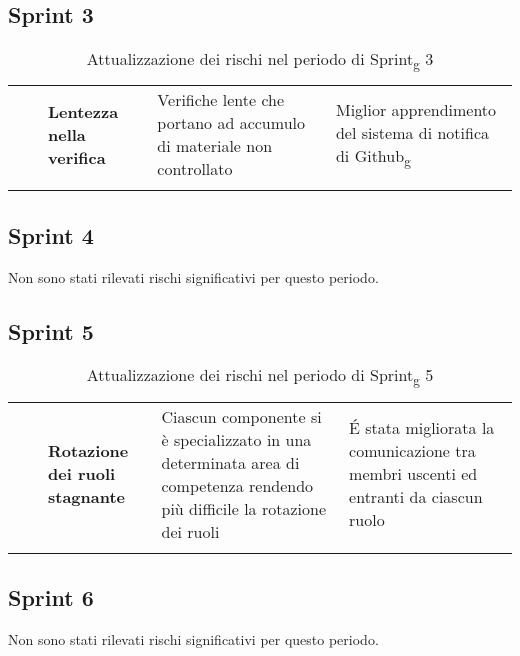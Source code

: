 \subsection{Sprint 3}
\begin{longtable}{ 
	>{\centering}M{0.20\textwidth} 
	>{\raggedright}M{0.30\textwidth}
	>{\raggedright}M{0.40\textwidth}
	}
	\rowcolorhead
	\centering 
	 &	
	 &
	\endfirsthead	
	\endhead
	
	\textbf{Lentezza nella verifica} & Verifiche lente che portano ad accumulo di materiale non controllato & Miglior apprendimento del sistema di notifica di Github\textsubscript{g} \tabularnewline
	\captionline \caption{Attualizzazione dei rischi nel periodo di Sprint\textsubscript{g} 3}
\end{longtable}

\subsection{Sprint 4}
Non sono stati rilevati rischi significativi per questo periodo.

\subsection{Sprint 5}
\begin{longtable}{ 
	>{\centering}M{0.20\textwidth} 
	>{\raggedright}M{0.30\textwidth}
	>{\raggedright}M{0.40\textwidth}
	}
	\rowcolorhead
	\centering 
	 &	
	 &
	\endfirsthead	
	\endhead
	
	\textbf{Rotazione dei ruoli stagnante} & Ciascun componente si è specializzato in una determinata area di competenza rendendo più difficile la rotazione dei ruoli & É stata migliorata la comunicazione tra membri uscenti ed entranti da ciascun ruolo \tabularnewline
	\captionline \caption{Attualizzazione dei rischi nel periodo di Sprint\textsubscript{g} 5}
\end{longtable}

\subsection{Sprint 6}
Non sono stati rilevati rischi significativi per questo periodo.